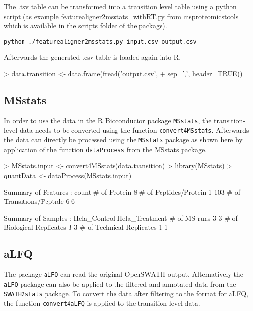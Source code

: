 \documentclass[a4paper]{article}
\begin{document}
The .tsv table can be transformed into a transition level table using a python script (as example featurealigner2msstats\_withRT.py from msproteomicstools which is available in the scripts folder of the package).

\texttt{python ./featurealigner2msstats.py input.csv output.csv}

Afterwards the generated .csv table is loaded again into R.
\begin{Schunk}
\begin{Sinput}
> data.transition <- data.frame(fread('output.csv',
+                                     sep=',', header=TRUE))
\end{Sinput}
\end{Schunk}


\subsection{MSstats}
In order to use the data in the R Bioconductor package \texttt{MSstats}, the transition-level data needs to be converted using the function \texttt{convert4MSstats}. Afterwards the data can directly be processed using the \texttt{MSstats} package as shown here by application of the function \texttt{dataProcess} from the MSstats package.

\begin{Schunk}
\begin{Sinput}
> MSstats.input <- convert4MSstats(data.transition)
> library(MSstats)
> quantData <- dataProcess(MSstats.input)
\end{Sinput}
\begin{Soutput}
  Summary of Features :
                         count
# of Protein                 8
# of Peptides/Protein    1-103
# of Transitions/Peptide   6-6
                      
  Summary of Samples :
                           Hela_Control Hela_Treatment
# of MS runs                          3              3
# of Biological Replicates            3              3
# of Technical Replicates             1              1
\end{Soutput}
\end{Schunk}

\subsection{aLFQ}
The package \texttt{aLFQ} can read the original OpenSWATH output. Alternatively the  \texttt{aLFQ} package can also be applied to the filtered and annotated data from the  \texttt{SWATH2stats} package.
To convert the data after filtering to the format for aLFQ, the function \texttt{convert4aLFQ} is applied to the transition-level data.
\end{document}

